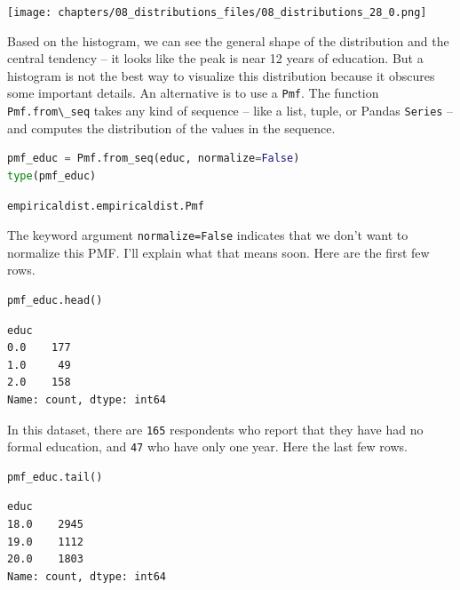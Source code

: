 \begin{center}
\texttt{[image: chapters/08\_distributions\_files/08\_distributions\_28\_0.png]}
\end{center}

Based on the histogram, we can see the general shape of the distribution
and the central tendency -- it looks like the peak is near 12 years of
education. But a histogram is not the best way to visualize this
distribution because it obscures some important details. An alternative
is to use a \passthrough{\lstinline!Pmf!}. The function
\passthrough{\lstinline!Pmf.from\_seq!} takes any kind of sequence --
like a list, tuple, or Pandas \passthrough{\lstinline!Series!} -- and
computes the distribution of the values in the sequence.

\begin{lstlisting}[language=Python,style=source]
pmf_educ = Pmf.from_seq(educ, normalize=False)
type(pmf_educ)
\end{lstlisting}

\begin{lstlisting}[style=output]
empiricaldist.empiricaldist.Pmf
\end{lstlisting}

The keyword argument \passthrough{\lstinline!normalize=False!} indicates
that we don't want to normalize this PMF. I'll explain what that means
soon. Here are the first few rows.

\begin{lstlisting}[language=Python,style=source]
pmf_educ.head()
\end{lstlisting}

\begin{lstlisting}[style=output]
educ
0.0    177
1.0     49
2.0    158
Name: count, dtype: int64
\end{lstlisting}

In this dataset, there are \passthrough{\lstinline!165!} respondents who
report that they have had no formal education, and
\passthrough{\lstinline!47!} who have only one year. Here the last few
rows.

\begin{lstlisting}[language=Python,style=source]
pmf_educ.tail()
\end{lstlisting}

\begin{lstlisting}[style=output]
educ
18.0    2945
19.0    1112
20.0    1803
Name: count, dtype: int64
\end{lstlisting}

